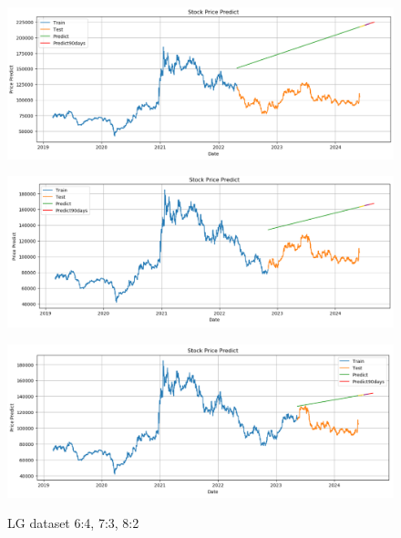 \documentclass[conference]{IEEEtran}
\begin{document}
\begin{figure}[H]
    \centering
    \begin{minipage}{0.15\textwidth}
    \centering
    \includegraphics[width=1\textwidth]{Image/Linear/Linear_LG_6_4.png}
   
    \label{fig:1}
    \end{minipage}%
    \begin{minipage}{0.15\textwidth}
    \centering
    \includegraphics[width=1\textwidth]{Image/Linear/Linear_LG_7_3.png}
  
    \label{fig:2}
    \end{minipage}%
    \begin{minipage}{0.15\textwidth}
    \centering
    \includegraphics[width=1\textwidth]{Image/Linear/Linear_LG_8_2.png}

    \label{fig:3}
    \end{minipage}
    \caption{LG dataset 6:4, 7:3, 8:2}
\end{figure}
\end{document}
